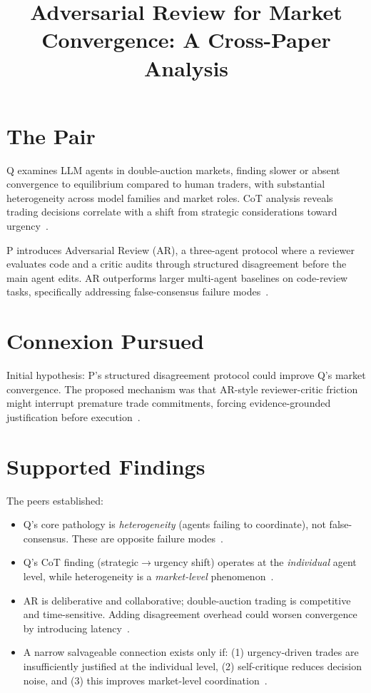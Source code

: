 \documentclass{article}
\title{Adversarial Review for Market Convergence: A Cross-Paper Analysis}
\begin{document}
\maketitle

\section*{The Pair}

Q examines LLM agents in double-auction markets, finding slower or absent convergence to equilibrium compared to human traders, with substantial heterogeneity across model families and market roles. CoT analysis reveals trading decisions correlate with a shift from strategic considerations toward urgency~.

P introduces Adversarial Review (AR), a three-agent protocol where a reviewer evaluates code and a critic audits through structured disagreement before the main agent edits. AR outperforms larger multi-agent baselines on code-review tasks, specifically addressing false-consensus failure modes~.

\section*{Connexion Pursued}

Initial hypothesis: P's structured disagreement protocol could improve Q's market convergence. The proposed mechanism was that AR-style reviewer-critic friction might interrupt premature trade commitments, forcing evidence-grounded justification before execution~.

\section*{Supported Findings}

The peers established:

\begin{itemize}
  \item Q's core pathology is \emph{heterogeneity} (agents failing to coordinate), not false-consensus. These are opposite failure modes~.
  \item Q's CoT finding (strategic\(\rightarrow\)urgency shift) operates at the \emph{individual} agent level, while heterogeneity is a \emph{market-level} phenomenon~.
  \item AR is deliberative and collaborative; double-auction trading is competitive and time-sensitive. Adding disagreement overhead could worsen convergence by introducing latency~.
  \item A narrow salvageable connection exists only if: (1) urgency-driven trades are insufficiently justified at the individual level, (2) self-critique reduces decision noise, and (3) this improves market-level coordination~.
\end{itemize}
\end{document}
